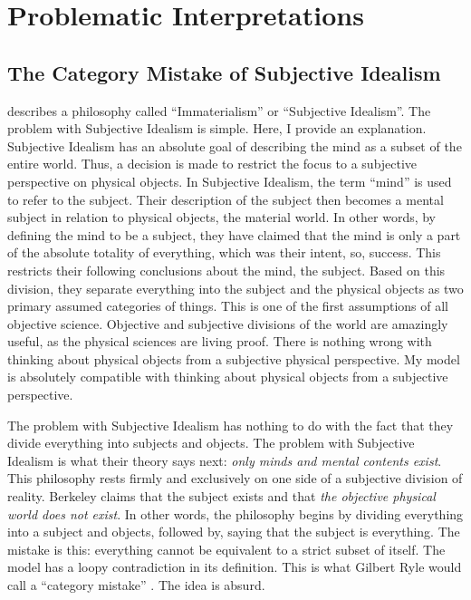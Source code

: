 \chapter{Problematic Interpretations}
\label{chapter:problematic_interpretations}

\section{The Category Mistake of Subjective Idealism}
\label{section:the_category_mistake_of_subjective_idealism}

\cite{berkeley:1734} describes a philosophy called ``Immaterialism''
or ``Subjective Idealism''.  The problem with Subjective Idealism is
simple.  Here, I provide an explanation.  Subjective Idealism has an
absolute goal of describing the mind as a subset of the entire world.
Thus, a decision is made to restrict the focus to a subjective
perspective on physical objects.  In Subjective Idealism, the term
``mind'' is used to refer to the subject.  Their description of the
subject then becomes a mental subject in relation to physical objects,
the material world.  In other words, by defining the mind to be a
subject, they have claimed that the mind is only a part of the
absolute totality of everything, which was their intent, so, success.
This restricts their following conclusions about the mind, the
subject.  Based on this division, they separate everything into the
subject and the physical objects as two primary assumed categories of
things.  This is one of the first assumptions of all objective
science.  Objective and subjective divisions of the world are
amazingly useful, as the physical sciences are living proof.  There is
nothing wrong with thinking about physical objects from a subjective
physical perspective.  My model is absolutely compatible with thinking
about physical objects from a subjective perspective.

The problem with Subjective Idealism has nothing to do with the fact
that they divide everything into subjects and objects.  The problem
with Subjective Idealism is what their theory says next: \emph{only
  minds and mental contents exist}.  This philosophy rests firmly and
exclusively on one side of a subjective division of reality.  Berkeley
claims that the subject exists and that \emph{the objective physical
  world does not exist}.  In other words, the philosophy begins by
dividing everything into a subject and objects, followed by, saying
that the subject is everything.  The mistake is this: everything
cannot be equivalent to a strict subset of itself.  The model has a
loopy contradiction in its definition.  This is what Gilbert Ryle
would call a ``category mistake'' \citep{ryle:1949}.  The idea is
absurd.


